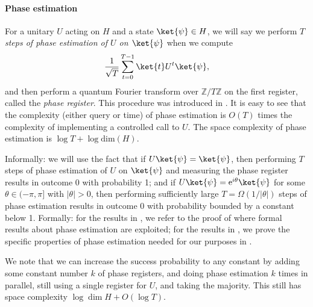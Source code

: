 \documentclass[11pt]{article}
\numberwithin{equation}{section}
\theoremstyle{definition}
\theoremstyle{plain}
\newcommand{\Z}{\mathbb Z}
\newcommand{\eee}{\mathrm e}
\begin{document}
\paragraph{Phase estimation}

For a unitary $U$ acting on $H$ and a state $\ket{\psi}\in H$, we will say we perform \emph{$T$ steps of phase estimation of $U$ on $\ket{\psi}$} when we compute %
$$\frac{1}{\sqrt{T}}\sum_{t=0}^{T-1}\ket{t}U^t\ket{\psi},$$
and then perform a quantum Fourier transform over $\Z/T\Z$ on the first register, called the \emph{phase register}.
This procedure was introduced in \cite{kit95}. It is easy to see that the complexity (either query or time) of phase estimation is $O(T)$ times the complexity of implementing a controlled call to $U$. The space complexity of phase estimation is $\log T+\log\mathrm{dim}(H)$.

Informally: we will use the fact that if $U\ket{\psi}=\ket{\psi}$, then performing $T$ steps of phase estimation of $U$ on $\ket{\psi}$ and measuring the phase register results in outcome 0 with probability 1; and if $U\ket{\psi}=\eee^{i\theta}\ket{\psi}$ for some $\theta\in (-\pi,\pi]$ with $|\theta|>0$, then performing sufficiently large $T=\Omega(1/|\theta|)$ steps of phase estimation results in outcome 0 with probability bounded by a constant below 1. Formally: for the results in , we refer to the proof of \cite[Lemma 3.2]{IJ15} where formal results about phase estimation are exploited; for the results in , we prove the specific properties of phase estimation needed for our purposes in . 

We note that we can increase the success probability to any constant by adding some constant number $k$ of phase registers, and doing phase estimation $k$ times in parallel, still using a single register for $U$, and taking the majority. This still has space complexity $\log\dim H + O(\log T)$.
\end{document}
